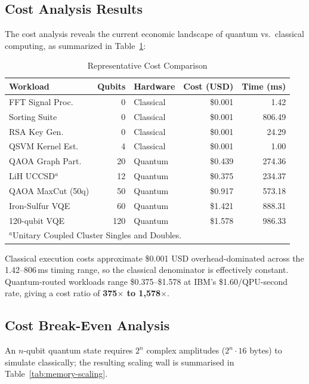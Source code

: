 \documentclass[10pt,conference]{IEEEtran}
\begin{document}
\subsection{Cost Analysis Results}

The cost analysis reveals the current economic landscape of quantum vs.\ classical computing, as summarized in Table~\ref{tab:cost-comparison}:

\begin{table}[htbp]
\caption{Representative Cost Comparison}
\label{tab:cost-comparison}
\centering
\footnotesize
\begin{tabular}{p{} r p{} r r}
\toprule
\textbf{Workload} & \textbf{Qubits} & \textbf{Hardware} & \textbf{Cost (USD)} & \textbf{Time (ms)} \\
\midrule
FFT Signal Proc. & 0 & Classical & \$0.001 & 1.42 \\
Sorting Suite & 0 & Classical & \$0.001 & 806.49 \\
RSA Key Gen. & 0 & Classical & \$0.001 & 24.29 \\
QSVM Kernel Est. & 4 & Classical & \$0.001 & 1.00 \\
QAOA Graph Part. & 20 & Quantum & \$0.439 & 274.36 \\
LiH UCCSD$^{a}$ & 12 & Quantum & \$0.375 & 234.37 \\
QAOA MaxCut (50q) & 50 & Quantum & \$0.917 & 573.18 \\
Iron-Sulfur VQE & 60 & Quantum & \$1.421 & 888.31 \\
120-qubit VQE & 120 & Quantum & \$1.578 & 986.33 \\
\bottomrule
\multicolumn{5}{l}{$^{a}$Unitary Coupled Cluster Singles and Doubles.} \\
\end{tabular}
\end{table}

Classical execution costs approximate \$0.001 USD overhead-dominated across the 1.42--806\,ms timing range, so the classical denominator is effectively constant. Quantum-routed workloads range \$0.375--\$1.578 at IBM's \$1.60/QPU-second rate, giving a cost ratio of \textbf{375$\times$ to 1{,}578$\times$}.

\subsection{Cost Break-Even Analysis}\label{sec:cost-break-even}

An $n$-qubit quantum state requires $2^n$ complex amplitudes ($2^n{\cdot}16$ bytes) to simulate classically; the resulting scaling wall is summarised in Table~\ref{tab:memory-scaling}.
\end{document}
